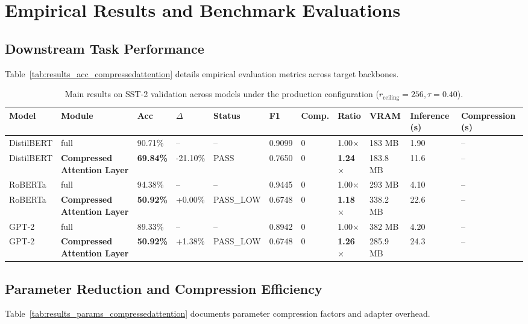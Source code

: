 \section{Empirical Results and Benchmark Evaluations}

\subsection{Downstream Task Performance}
Table~\ref{tab:results_acc_compressedattention} details empirical evaluation metrics across target backbones.

\begin{table}[t]
\centering
\small
\begin{tabular}{lllllllllll}
\toprule
\textbf{Model} & \textbf{Module} & \textbf{Acc} & \textbf{$\Delta$} & \textbf{Status} & \textbf{F1} & \textbf{Comp.} & \textbf{Ratio} & \textbf{VRAM} & \textbf{Inference (s)} & \textbf{Compression (s)} \\
\midrule
DistilBERT & full & 90.71\% & -- & -- & 0.9099 & 0 & 1.00$\times$ & 183 MB & 1.90 & -- \\
DistilBERT & \textbf{Compressed Attention Layer} & \textbf{69.84\%} & -21.10\% & PASS & 0.7650 & 0 & \textbf{1.24$\times$} & 183.8 MB & 11.6 & -- \\
RoBERTa & full & 94.38\% & -- & -- & 0.9445 & 0 & 1.00$\times$ & 293 MB & 4.10 & -- \\
RoBERTa & \textbf{Compressed Attention Layer} & \textbf{50.92\%} & +0.00\% & PASS_LOW & 0.6748 & 0 & \textbf{1.18$\times$} & 338.2 MB & 22.6 & -- \\
GPT-2 & full & 89.33\% & -- & -- & 0.8942 & 0 & 1.00$\times$ & 382 MB & 4.20 & -- \\
GPT-2 & \textbf{Compressed Attention Layer} & \textbf{50.92\%} & +1.38\% & PASS_LOW & 0.6748 & 0 & \textbf{1.26$\times$} & 285.9 MB & 24.3 & -- \\
\bottomrule
\end{tabular}
\caption{Main results on SST-2 validation across models under the production configuration ($r_{\mathrm{ceiling}}=256, \tau=0.40$).}
\label{tab:main_sst2}
\end{table}

\subsection{Parameter Reduction and Compression Efficiency}
Table~\ref{tab:results_params_compressedattention} documents parameter compression factors and adapter overhead.

